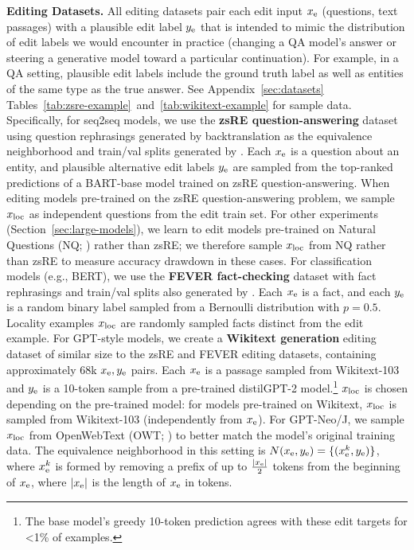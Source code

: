 \documentclass{article}
\begin{document}
\textbf{Editing Datasets.} All editing datasets pair each edit input $x_\text{e}$ (questions, text passages) with a plausible edit label $y_\text{e}$ that is intended to mimic the distribution of edit labels we would encounter in practice (changing a QA model's answer or steering a generative model toward a particular continuation). For example, in a QA setting, plausible edit labels include the ground truth label as well as entities of the same type as the true answer. See Appendix~\ref{sec:datasets} Tables~\ref{tab:zsre-example}~and~\ref{tab:wikitext-example} for sample data. Specifically, for seq2seq models, we use the \textbf{zsRE question-answering} dataset \citep{levy2017zero} using question rephrasings generated by backtranslation as the equivalence neighborhood and train/val splits generated by \citet{Cao2021EditingFK}. Each $x_\text{e}$ is a question about an entity, and plausible alternative edit labels $y_\text{e}$ are sampled from the top-ranked predictions of a BART-base model trained on zsRE question-answering. When editing models pre-trained on the zsRE question-answering problem, we sample $x_\text{loc}$ as independent questions from the edit train set. For other experiments (Section~\ref{sec:large-models}), we learn to edit models pre-trained on Natural Questions (NQ; \citet{kwiatkowski2019natural}) rather than zsRE; we therefore sample $x_\text{loc}$ from NQ rather than zsRE to measure accuracy drawdown in these cases. For classification models (e.g., BERT), we use the \textbf{FEVER fact-checking} dataset \citep{Thorne18Fever} with fact rephrasings and train/val splits also generated by \citet{Cao2021EditingFK}. Each $x_\text{e}$ is a fact, and each $y_\text{e}$ is a random binary label sampled from a Bernoulli distribution with $p=0.5$. Locality examples $x_\text{loc}$ are randomly sampled facts distinct from the edit example. For GPT-style models, we create a \textbf{Wikitext generation} editing dataset of similar size to the zsRE and FEVER editing datasets, containing approximately 68k $x_\text{e},y_\text{e}$ pairs. Each $x_\text{e}$ is a passage sampled from Wikitext-103 and $y_\text{e}$ is a 10-token sample from a pre-trained distilGPT-2 model.\footnote{The base model's greedy 10-token prediction agrees with these edit targets for \textless 1\% of examples.} $x_\text{loc}$ is chosen depending on the pre-trained model: for models pre-trained on Wikitext, $x_\text{loc}$ is sampled from Wikitext-103 (independently from $x_\text{e}$). For GPT-Neo/J, we sample $x_\text{loc}$ from OpenWebText (OWT; \citep{Gokaslan2019OpenWeb}) to better match the model's original training data. The equivalence neighborhood in this setting is $N(x_\text{e},y_\text{e}) = \{(x_\text{e}^k,y_\text{e})\}$, where ${x_\text{e}^k}$ is formed by removing a prefix of up to $\frac{|x_\text{e}|}{2}$ tokens from the beginning of $x_\text{e}$, where $|x_\text{e}|$ is the length of $x_\text{e}$ in tokens.
\end{document}
